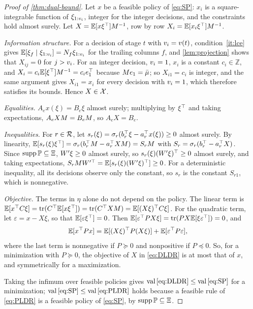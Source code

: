 \begin{proof}[Proof of \cref{thm:dual-bound}]
Let $x$ be a feasible policy of \eqref{eq:SP}: $x_i$ is a square-integrable function of $\xi_{1:v_i}$, integer for the integer decisions, and the constraints hold almost surely.
Let $X = \mathbb{E}[x\xi^\top]M^{-1}$, row by row $X_i = \mathbb{E}[x_i\xi^\top]M^{-1}$.

\emph{Information structure.}
For a decision of stage $t$ with $v_i = v(t)$, condition~\ref{it:lce} gives $\mathbb{E}[\xi_f\mid\xi_{1:v_i}] = N_f\xi_{1:v_i}$ for the trailing columns $f$,
and \cref{lem:projection} shows that $X_{ij} = 0$ for $j > v_i$.
For an integer decision, $v_i = 1$, $x_i$ is a constant $c_i \in \mathbb{Z}$, and $X_i = c_i\mathbb{E}[\xi^\top]M^{-1} = c_ie_1^\top$ because $Me_1 = \bar\mu$;
so $X_{i1} = c_i$ is integer, and the same argument gives $X_{i1} = x_i$ for every decision with $v_i = 1$, which therefore satisfies its bounds.
Hence $X \in \mathcal{X}$.

\emph{Equalities.}
$A_ex(\xi) = B_e\xi$ almost surely; multiplying by $\xi^\top$ and taking expectations, $A_eXM = B_eM$, so $A_eX = B_e$.

\emph{Inequalities.}
For $r \in \mathcal{R}$, let $s_r(\xi) = \sigma_r(b_r^\top\xi - a_r^\top x(\xi)) \ge 0$ almost surely.
By linearity, $\mathbb{E}[s_r(\xi)\xi^\top] = \sigma_r(b_r^\top M - a_r^\top XM) = S_rM$ with $S_r = \sigma_r(b_r^\top - a_r^\top X)$.
Since $\operatorname{supp}\mathbb{P} \subseteq \Xi$, $W'\xi \ge 0$ almost surely, so $s_r(\xi)(W'\xi)^\top \ge 0$ almost surely, and taking expectations,
$S_rMW'^\top = \mathbb{E}[s_r(\xi)(W'\xi)^\top] \ge 0$.
For a deterministic inequality, all its decisions observe only the constant, so $s_r$ is the constant $S_{r1}$, which is nonnegative.

\emph{Objective.}
The terms in $\eta$ alone do not depend on the policy.
The linear term is $\mathbb{E}[x^\top C\xi] = \operatorname{tr}(C^\top\mathbb{E}[x\xi^\top]) = \operatorname{tr}(C^\top XM) = \mathbb{E}[(X\xi)^\top C\xi]$.
For the quadratic term, let $\varepsilon = x - X\xi$, so that $\mathbb{E}[\varepsilon\xi^\top] = 0$.
Then $\mathbb{E}[\varepsilon^\top P X\xi] = \operatorname{tr}(PX\mathbb{E}[\xi\varepsilon^\top]) = 0$, and
\[
\mathbb{E}[x^\top Px] = \mathbb{E}[(X\xi)^\top P(X\xi)] + \mathbb{E}[\varepsilon^\top P\varepsilon],
\]
where the last term is nonnegative if $P \succeq 0$ and nonpositive if $P \preceq 0$.
So, for a minimization with $P \succeq 0$, the objective of $X$ in \eqref{eq:DLDR} is at most that of $x$, and symmetrically for a maximization.

Taking the infimum over feasible policies gives $\operatorname{val}\eqref{eq:DLDR} \le \operatorname{val}\eqref{eq:SP}$ for a minimization;
$\operatorname{val}\eqref{eq:SP} \le \operatorname{val}\eqref{eq:PLDR}$ holds because a feasible rule of \eqref{eq:PLDR} is a feasible policy of \eqref{eq:SP}, by $\operatorname{supp}\mathbb{P}\subseteq\Xi$.
\end{proof}

